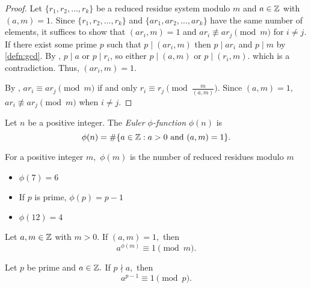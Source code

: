 \documentclass{../ximera}
\begin{document}
\begin{proof}
    Let $\{r_1,r_2,\dots,r_k\}$ be a reduced residue system modulo $m$ and $a\in\mathbb Z$ with $(a,m)=1.$ Since $\{r_1,r_2,\dots,r_k\}$ and $\{ar_1,ar_2,\dots,ar_k\}$ have the same number of elements, it suffices to show that $(ar_i,m)=1$ and  $ar_i\not\equiv ar_j\pmod{m}$ for $i\neq j.$ If there exist some prime $p$ such that $p\mid(ar_i,m)$ then $p\mid ar_i$ and $p\mid m$ by \autoref{defn:gcd}. By , $p\mid a$ or $p\mid r_i$, so either $p\mid (a,m)$ or $p\mid (r_i,m).$ which is a contradiction. Thus, $(ar_i,m)=1.$

    By , $ar_i\equiv ar_j\pmod{m}$ if and only $r_i\equiv r_j \pmod{\tfrac{m}{(a,m)}}.$ Since $(a,m)=1,$ $ar_i\not\equiv ar_j\pmod{m}$ when $i\neq j$.
\end{proof}


\begin{defn}\label{defn:phi-fn}
    Let $n$ be a positive integer. The \emph{Euler $\phi$-function} $\phi(n)$ is \[\phi(n)=\#\{a\in\mathbb Z : a>0 \textnormal{ and } (a,m)=1\}.\]
\end{defn}


\begin{remark}
    For a positive integer $m,$ $\phi(m)$ is the number of reduced residues modulo $m$
\end{remark}
\begin{example}\label{example:phi}
    
    \begin{itemize}
        \item $\phi(7)=6$
        
        \item If $p$ is prime, $\phi(p)=p-1$
        
        \item $\phi(12)=4$
    \end{itemize}
\end{example}

\begin{thm*}\label{thm:euler-FlT}
    Let $a,m\in\mathbb Z$ with $m>0.$ If $(a,m)=1,$ then \[a^{\phi(m)}\equiv 1\pmod{m}.\]
\end{thm*}



\begin{cor*}\label{FlT}
    Let $p$ be prime and $a\in\mathbb Z.$ If $p\nmid a,$ then \[a^{p-1}\equiv 1\pmod{p}.\]
\end{cor*}
\end{document}
